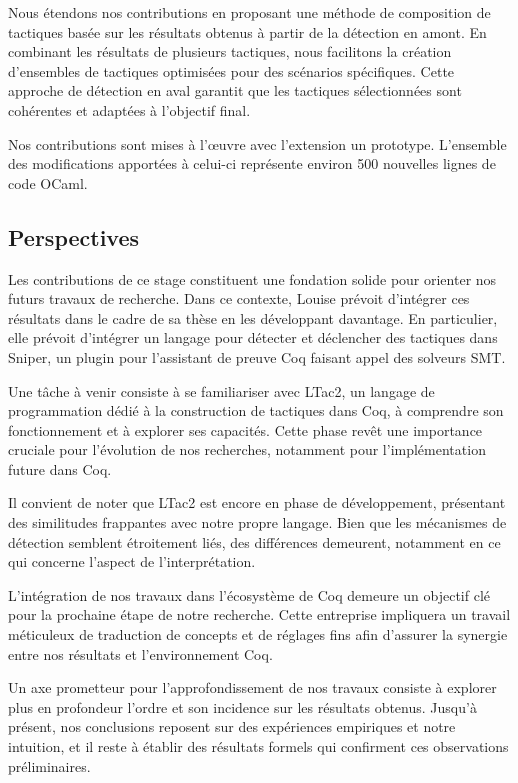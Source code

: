 \documentclass[french,titlepage]{article}
\begin{document}
Nous étendons nos contributions en proposant une méthode de composition de tactiques basée sur les résultats obtenus à partir de la détection en amont. En combinant les résultats de plusieurs tactiques, nous facilitons la création d'ensembles de tactiques optimisées pour des scénarios spécifiques. Cette approche de détection en aval garantit que les tactiques sélectionnées sont cohérentes et adaptées à l'objectif final.

Nos contributions sont mises à l'œuvre avec l'extension un prototype. L'ensemble des modifications apportées à celui-ci représente environ 500 nouvelles lignes de code OCaml.

\subsection{Perspectives} \label{conclusion:perspectives}
Les contributions de ce stage constituent une fondation solide pour orienter nos futurs travaux de recherche. Dans ce contexte, Louise prévoit d'intégrer ces résultats dans le cadre de sa thèse en les développant davantage. En particulier, elle prévoit d'intégrer un langage pour détecter et déclencher des tactiques dans Sniper, un plugin pour l'assistant de preuve Coq faisant appel des solveurs SMT.

Une tâche à venir consiste à se familiariser avec LTac2, un langage de programmation dédié à la construction de tactiques dans Coq, à comprendre son fonctionnement et à explorer ses capacités. Cette phase revêt une importance cruciale pour l'évolution de nos recherches, notamment pour l'implémentation future dans Coq.

Il convient de noter que LTac2 est encore en phase de développement, présentant des similitudes frappantes avec notre propre langage. Bien que les mécanismes de détection semblent étroitement liés, des différences demeurent, notamment en ce qui concerne l'aspect de l'interprétation.

L'intégration de nos travaux dans l'écosystème de Coq demeure un objectif clé pour la prochaine étape de notre recherche. Cette entreprise impliquera un travail méticuleux de traduction de concepts et de réglages fins afin d'assurer la synergie entre nos résultats et l'environnement Coq.

Un axe prometteur pour l'approfondissement de nos travaux consiste à explorer plus en profondeur l'ordre et son incidence sur les résultats obtenus. Jusqu'à présent, nos conclusions reposent sur des expériences empiriques et notre intuition, et il reste à établir des résultats formels qui confirment ces observations préliminaires.
\end{document}
